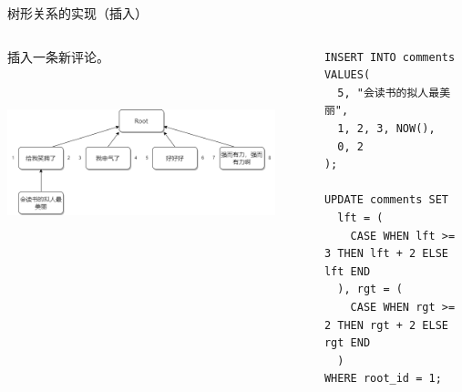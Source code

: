 \documentclass[UTF8]{ctexbeamer}
\begin{document}
\begin{frame}[fragile]{树形关系的实现（插入）}
\begin{columns}
\begin{column}{0.5\textwidth}
插入一条新评论\footnotemark[1]。

~

\includegraphics[width=0.9\textwidth, keepaspectratio]{assets/comment_init.png}
\end{column}
\begin{column}{0.45\textwidth}
\begin{verbatim}
INSERT INTO comments VALUES(
  5, "会读书的拟人最美丽",
  1, 2, 3, NOW(),
  0, 2
);

UPDATE comments SET
  lft = (
    CASE WHEN lft >= 3 THEN lft + 2 ELSE lft END
  ), rgt = (
    CASE WHEN rgt >= 2 THEN rgt + 2 ELSE rgt END
  )
WHERE root_id = 1;
\end{verbatim}
\end{column}
\end{columns}

\end{frame}
\end{document}
